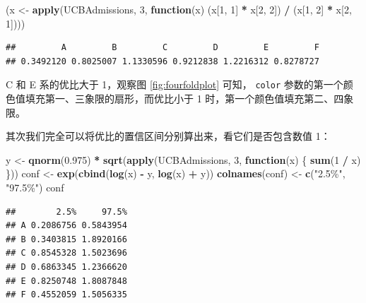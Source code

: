 \documentclass[
  b5paper,
  UTF8,twoside]{book}
\newenvironment{Shaded}{\begin{snugshade}}{\end{snugshade}}
\newcommand{\ControlFlowTok}[1]{\textcolor[rgb]{0.13,0.29,0.53}{\textbf{#1}}}
\newcommand{\DecValTok}[1]{\textcolor[rgb]{0.00,0.00,0.81}{#1}}
\newcommand{\FloatTok}[1]{\textcolor[rgb]{0.00,0.00,0.81}{#1}}
\newcommand{\FunctionTok}[1]{\textcolor[rgb]{0.13,0.29,0.53}{\textbf{#1}}}
\newcommand{\NormalTok}[1]{#1}
\newcommand{\OtherTok}[1]{\textcolor[rgb]{0.56,0.35,0.01}{#1}}
\newcommand{\SpecialCharTok}[1]{\textcolor[rgb]{0.81,0.36,0.00}{\textbf{#1}}}
\newcommand{\StringTok}[1]{\textcolor[rgb]{0.31,0.60,0.02}{#1}}
\begin{document}
\begin{Shaded}
\begin{Highlighting}[]
\NormalTok{(x }\OtherTok{\textless{}{-}} \FunctionTok{apply}\NormalTok{(UCBAdmissions, }\DecValTok{3}\NormalTok{, }\ControlFlowTok{function}\NormalTok{(x) (x[}\DecValTok{1}\NormalTok{, }\DecValTok{1}\NormalTok{] }\SpecialCharTok{*}\NormalTok{ x[}\DecValTok{2}\NormalTok{, }\DecValTok{2}\NormalTok{]) }\SpecialCharTok{/}\NormalTok{ (x[}\DecValTok{1}\NormalTok{, }\DecValTok{2}\NormalTok{] }\SpecialCharTok{*}\NormalTok{ x[}\DecValTok{2}\NormalTok{, }\DecValTok{1}\NormalTok{])))}
\end{Highlighting}
\end{Shaded}

\begin{verbatim}
##         A         B         C         D         E         F 
## 0.3492120 0.8025007 1.1330596 0.9212838 1.2216312 0.8278727
\end{verbatim}

C 和 E 系的优比大于 1，观察图 \ref{fig:fourfoldplot} 可知， \texttt{color} 参数的第一个颜色值填充第一、三象限的扇形，而优比小于 1 时，第一个颜色值填充第二、四象限。

其次我们完全可以将优比的置信区间分别算出来，看它们是否包含数值 1：

\begin{Shaded}
\begin{Highlighting}[]
\NormalTok{y }\OtherTok{\textless{}{-}} \FunctionTok{qnorm}\NormalTok{(}\FloatTok{0.975}\NormalTok{) }\SpecialCharTok{*} \FunctionTok{sqrt}\NormalTok{(}\FunctionTok{apply}\NormalTok{(UCBAdmissions, }\DecValTok{3}\NormalTok{, }\ControlFlowTok{function}\NormalTok{(x) \{}
  \FunctionTok{sum}\NormalTok{(}\DecValTok{1} \SpecialCharTok{/}\NormalTok{ x)}
\NormalTok{\}))}
\NormalTok{conf }\OtherTok{\textless{}{-}} \FunctionTok{exp}\NormalTok{(}\FunctionTok{cbind}\NormalTok{(}\FunctionTok{log}\NormalTok{(x) }\SpecialCharTok{{-}}\NormalTok{ y, }\FunctionTok{log}\NormalTok{(x) }\SpecialCharTok{+}\NormalTok{ y))}
\FunctionTok{colnames}\NormalTok{(conf) }\OtherTok{\textless{}{-}} \FunctionTok{c}\NormalTok{(}\StringTok{"2.5\%"}\NormalTok{, }\StringTok{"97.5\%"}\NormalTok{)}
\NormalTok{conf}
\end{Highlighting}
\end{Shaded}

\begin{verbatim}
##        2.5%     97.5%
## A 0.2086756 0.5843954
## B 0.3403815 1.8920166
## C 0.8545328 1.5023696
## D 0.6863345 1.2366620
## E 0.8250748 1.8087848
## F 0.4552059 1.5056335
\end{verbatim}
\end{document}
